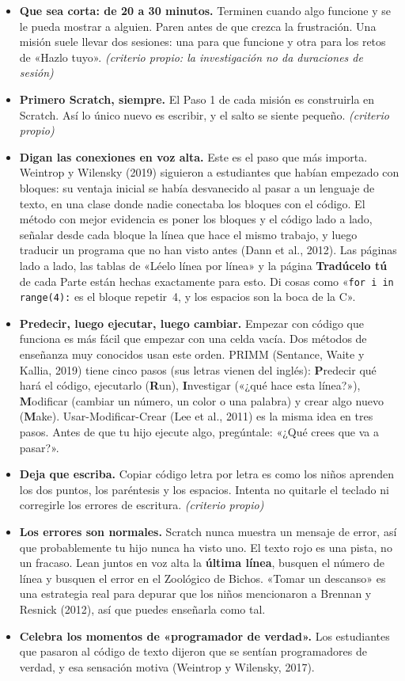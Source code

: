 \begin{itemize}
  \item \textbf{Que sea corta: de 20 a 30 minutos.} Terminen cuando algo funcione y se le pueda mostrar a alguien. Paren antes de que crezca la frustración. Una misión suele llevar dos sesiones: una para que funcione y otra para los retos de «Hazlo tuyo». \textit{(criterio propio: la investigación no da duraciones de sesión)}
  \item \textbf{Primero Scratch, siempre.} El Paso 1 de cada misión es construirla en Scratch. Así lo único nuevo es escribir, y el salto se siente pequeño. \textit{(criterio propio)}
  \item \textbf{Digan las conexiones en voz alta.} Este es el paso que más importa. Weintrop y Wilensky (2019) siguieron a estudiantes que habían empezado con bloques: su ventaja inicial se había desvanecido al pasar a un lenguaje de texto, en una clase donde nadie conectaba los bloques con el código. El método con mejor evidencia es poner los bloques y el código lado a lado, señalar desde cada bloque la línea que hace el mismo trabajo, y luego traducir un programa que no han visto antes (Dann et al., 2012). Las páginas lado a lado, las tablas de «Léelo línea por línea» y la página \textbf{Tradúcelo tú} de cada Parte están hechas exactamente para esto. Di cosas como «\texttt{for i in range(4):} es el bloque repetir~4, y los espacios son la boca de la C».
  \item \textbf{Predecir, luego ejecutar, luego cambiar.} Empezar con código que funciona es más fácil que empezar con una celda vacía. Dos métodos de enseñanza muy conocidos usan este orden. PRIMM (Sentance, Waite y Kallia, 2019) tiene cinco pasos (sus letras vienen del inglés): \textbf{P}redecir qué hará el código, ejecutarlo (\textbf{R}un), \textbf{I}nvestigar («¿qué hace esta línea?»), \textbf{M}odificar (cambiar un número, un color o una palabra) y crear algo nuevo (\textbf{M}ake). Usar-Modificar-Crear (Lee et al., 2011) es la misma idea en tres pasos. Antes de que tu hijo ejecute algo, pregúntale: «¿Qué crees que va a pasar?».
  \item \textbf{Deja que escriba.} Copiar código letra por letra es como los niños aprenden los dos puntos, los paréntesis y los espacios. Intenta no quitarle el teclado ni corregirle los errores de escritura. \textit{(criterio propio)}
  \item \textbf{Los errores son normales.} Scratch nunca muestra un mensaje de error, así que probablemente tu hijo nunca ha visto uno. El texto rojo es una pista, no un fracaso. Lean juntos en voz alta la \textbf{última línea}, busquen el número de línea y busquen el error en el Zoológico de Bichos. «Tomar un descanso» es una estrategia real para depurar que los niños mencionaron a Brennan y Resnick (2012), así que puedes enseñarla como tal.
  \item \textbf{Celebra los momentos de «programador de verdad».} Los estudiantes que pasaron al código de texto dijeron que se sentían programadores de verdad, y esa sensación motiva (Weintrop y Wilensky, 2017).
\end{itemize}

